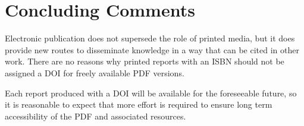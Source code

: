 \documentclass{article}
\begin{document}
 \section{Concluding Comments}
 
Electronic publication does not supersede the role of printed media, but it does provide new routes to disseminate knowledge in a way that can be cited in other work. There are no reasons why printed reports with an ISBN should not be assigned a DOI for freely available PDF versions.

Each report produced with a DOI will be available for the foreseeable future, so it is reasonable to expect that more effort is required to ensure long term accessibility of the PDF and associated resources.




\end{document}
